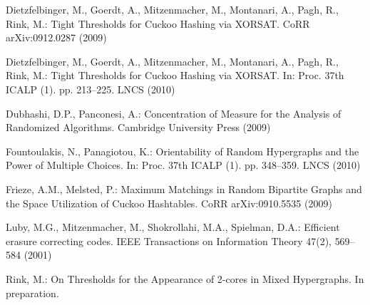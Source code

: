 \let\accentvec\vec \documentclass{llncs}
\begin{document}
\ifnum{}


\else
\begin{thebibliography}{1}
\providecommand{\url}[1]{\texttt{#1}}
\providecommand{\urlprefix}{URL }

Dietzfelbinger, M., Goerdt, A., Mitzenmacher, M., Montanari, A., Pagh, R.,
  Rink, M.: {Tight Thresholds for Cuckoo Hashing via XORSAT}. CoRR
  arXiv:0912.0287 (2009)

Dietzfelbinger, M., Goerdt, A., Mitzenmacher, M., Montanari, A., Pagh, R.,
  Rink, M.: {Tight Thresholds for Cuckoo Hashing via XORSAT}. In: Proc. 37th
  ICALP (1). pp. 213--225. LNCS (2010)

Dubhashi, D.P., Panconesi, A.: {Concentration of Measure for the Analysis of
  Randomized Algorithms}. Cambridge University Press (2009)

Fountoulakis, N., Panagiotou, K.: {Orientability of Random Hypergraphs and the
  Power of Multiple Choices}. In: Proc. 37th ICALP (1). pp. 348--359. LNCS
  (2010)

Frieze, A.M., Melsted, P.: {Maximum Matchings in Random Bipartite Graphs and
  the Space Utilization of Cuckoo Hashtables}. CoRR  arXiv:0910.5535 (2009)

Luby, M.G., Mitzenmacher, M., Shokrollahi, M.A., Spielman, D.A.: {Efficient
  erasure correcting codes}. IEEE Transactions on Information Theory  47(2),
  569--584 (2001)

Rink, M.: {On Thresholds for the Appearance of 2-cores in Mixed Hypergraphs}.
  In preparation.

\end{thebibliography}
\fi

\ifnum{}
\newpage
\appendix
\end{document}
